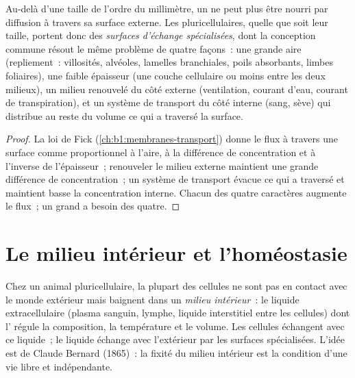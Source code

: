 \begin{proposition}\label{prop:b1:organism-environment:surfaces}
Au-delà d'une taille de l'ordre du millimètre, un  ne peut plus
être nourri par diffusion à travers sa surface externe. Les 
pluricellulaires, quelle que soit leur taille, portent donc des
\emph{surfaces d'échange spécialisées}, dont la
conception commune résout le même problème de quatre façons~: une grande
aire (repliement~: villosités, alvéoles, lamelles branchiales, poils
absorbants, limbes foliaires), une faible épaisseur (une couche
cellulaire ou moins entre les deux milieux), un milieu renouvelé du côté
externe (ventilation, courant d'eau, courant de transpiration), et un
système de transport du côté interne (sang, sève) qui distribue au reste
du volume ce qui a traversé la surface.
\end{proposition}
\begin{proof}
La loi de Fick (\cref{ch:b1:membranes-transport}) donne le flux à
travers une surface comme proportionnel à l'aire, à la différence de
concentration et à l'inverse de l'épaisseur~; renouveler le milieu
externe maintient une grande différence de concentration~; un système de
transport évacue ce qui a traversé et maintient basse la concentration
interne. Chacun des quatre caractères augmente le flux~; un grand
 a besoin des quatre.
\end{proof}

\section{Le milieu intérieur et l'homéostasie}

\begin{definition}\label{def:b1:organism-environment:milieu}
Chez un animal pluricellulaire, la plupart des cellules ne sont pas en
contact avec le monde extérieur mais baignent dans un \emph{milieu
intérieur}~: le liquide extracellulaire (plasma
sanguin, lymphe, liquide interstitiel entre les cellules) dont
l' régule la composition, la température et le volume. Les
cellules échangent avec ce liquide~; le liquide échange avec l'extérieur
par les surfaces spécialisées. L'idée est de Claude Bernard (1865)~: la
fixité du milieu intérieur est la condition d'une vie libre et
indépendante.
\end{definition}


